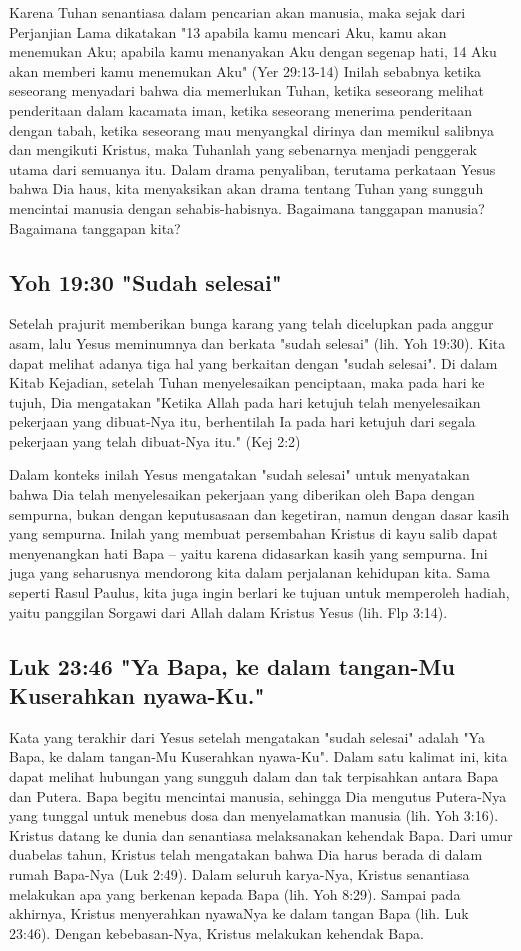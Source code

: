Karena Tuhan senantiasa dalam pencarian akan manusia, maka sejak dari
Perjanjian Lama dikatakan "13 apabila kamu mencari Aku, kamu akan menemukan
Aku; apabila kamu menanyakan Aku dengan segenap hati, 14  Aku akan memberi kamu
menemukan Aku" (Yer 29:13-14) Inilah sebabnya ketika seseorang menyadari bahwa
dia memerlukan Tuhan, ketika seseorang melihat penderitaan dalam kacamata iman,
ketika seseorang menerima penderitaan dengan tabah, ketika seseorang mau
menyangkal dirinya dan memikul salibnya dan mengikuti Kristus, maka Tuhanlah
yang sebenarnya menjadi penggerak utama dari semuanya itu. Dalam drama
penyaliban, terutama perkataan Yesus bahwa Dia haus, kita menyaksikan akan
drama tentang Tuhan yang sungguh mencintai manusia dengan sehabis-habisnya.
Bagaimana tanggapan manusia? Bagaimana tanggapan kita?

\subsection{Yoh 19:30 "Sudah selesai"}
Setelah prajurit memberikan bunga karang yang telah dicelupkan pada anggur
asam, lalu Yesus meminumnya dan berkata "sudah selesai" (lih. Yoh 19:30). Kita
dapat melihat adanya tiga hal yang berkaitan dengan "sudah selesai". Di dalam
Kitab Kejadian, setelah Tuhan menyelesaikan penciptaan, maka pada hari ke
tujuh, Dia mengatakan "Ketika Allah pada hari ketujuh telah menyelesaikan
pekerjaan yang dibuat-Nya itu, berhentilah Ia pada hari
ketujuh dari segala pekerjaan yang telah dibuat-Nya itu." (Kej 2:2) 

Dalam konteks inilah Yesus mengatakan "sudah selesai" untuk menyatakan
bahwa Dia telah menyelesaikan pekerjaan yang diberikan oleh Bapa dengan
sempurna, bukan dengan keputusasaan dan kegetiran, namun dengan dasar kasih
yang sempurna. Inilah yang membuat persembahan Kristus di kayu salib dapat
menyenangkan hati Bapa -- yaitu karena didasarkan kasih yang sempurna.
Ini juga yang seharusnya mendorong kita dalam perjalanan kehidupan kita. Sama
seperti Rasul Paulus, kita juga ingin berlari ke tujuan untuk memperoleh
hadiah, yaitu panggilan Sorgawi dari Allah dalam Kristus Yesus (lih. Flp 3:14).

\subsection{Luk 23:46 "Ya Bapa, ke dalam tangan-Mu Kuserahkan nyawa-Ku."}
Kata yang terakhir dari Yesus setelah mengatakan "sudah selesai" adalah "Ya
Bapa, ke dalam tangan-Mu Kuserahkan nyawa-Ku". Dalam satu kalimat ini, kita
dapat melihat hubungan yang sungguh dalam dan tak terpisahkan antara Bapa dan
Putera. Bapa begitu mencintai manusia, sehingga Dia mengutus Putera-Nya yang
tunggal untuk menebus dosa dan menyelamatkan manusia (lih. Yoh 3:16). Kristus
datang ke dunia dan senantiasa melaksanakan kehendak Bapa. Dari umur duabelas
tahun, Kristus telah mengatakan bahwa Dia harus berada di dalam rumah Bapa-Nya
(Luk 2:49). Dalam seluruh karya-Nya, Kristus senantiasa melakukan apa yang
berkenan kepada Bapa (lih. Yoh 8:29). Sampai pada akhirnya, Kristus menyerahkan
nyawaNya ke dalam tangan Bapa (lih. Luk 23:46). Dengan kebebasan-Nya, Kristus
melakukan kehendak Bapa.

